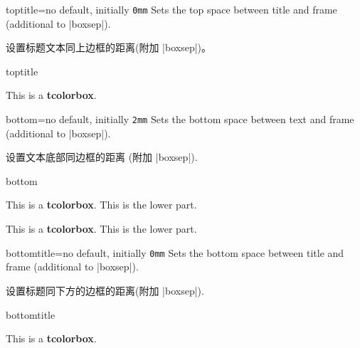 \begin{docTcbKey}{toptitle}{=}{no default, initially \texttt{0mm}}
  Sets the top space between title and frame (additional to |boxsep|).

设置标题文本同上边框的距离(附加 |boxsep|)。    
\begin{exdispExample}{toptitle}

\begin{tcolorbox}[toptitle=3mm,title=My title]
This is a \textbf{tcolorbox}.
\end{tcolorbox}
\end{exdispExample}
\end{docTcbKey}






\begin{docTcbKey}{bottom}{=}{no default, initially \texttt{2mm}}
  Sets the bottom space between text and frame (additional to |boxsep|).

设置文本底部同边框的距离 (附加 |boxsep|).
\begin{exdispExample}{bottom}

\begin{tcolorbox}[bottom=0mm]
This is a \textbf{tcolorbox}.
\tcblower
This is the lower part.
\end{tcolorbox}
\begin{tcolorbox}
  This is a \textbf{tcolorbox}.
  \tcblower
  This is the lower part.
  \end{tcolorbox}
\end{exdispExample}
\end{docTcbKey}

\begin{docTcbKey}{bottomtitle}{=}{no default, initially \texttt{0mm}}
  Sets the bottom space between title and frame (additional to |boxsep|).

设置标题同下方的边框的距离(附加 |boxsep|).
\begin{exdispExample}{bottomtitle}

\begin{tcolorbox}[bottomtitle=3mm,title=My title]
This is a \textbf{tcolorbox}.
\end{tcolorbox}
\end{exdispExample}
\end{docTcbKey}



